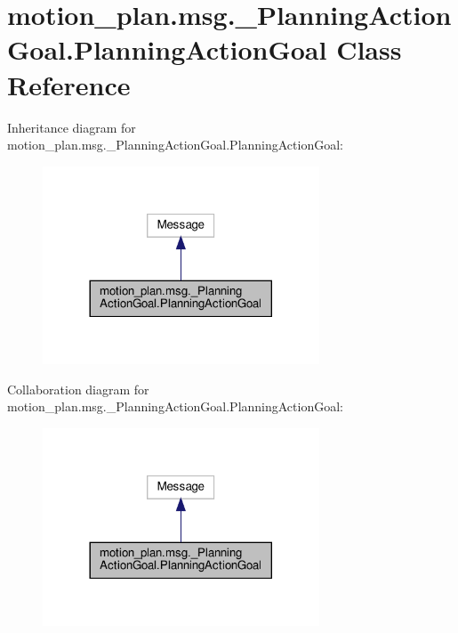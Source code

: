 \hypertarget{classmotion__plan_1_1msg_1_1__PlanningActionGoal_1_1PlanningActionGoal}{}\section{motion\+\_\+plan.\+msg.\+\_\+\+Planning\+Action\+Goal.\+Planning\+Action\+Goal Class Reference}
\label{classmotion__plan_1_1msg_1_1__PlanningActionGoal_1_1PlanningActionGoal}


Inheritance diagram for motion\+\_\+plan.\+msg.\+\_\+\+Planning\+Action\+Goal.\+Planning\+Action\+Goal\+:
\nopagebreak
\begin{figure}[H]
\begin{center}
\leavevmode
\includegraphics[width=233pt]{classmotion__plan_1_1msg_1_1__PlanningActionGoal_1_1PlanningActionGoal__inherit__graph}
\end{center}
\end{figure}


Collaboration diagram for motion\+\_\+plan.\+msg.\+\_\+\+Planning\+Action\+Goal.\+Planning\+Action\+Goal\+:
\nopagebreak
\begin{figure}[H]
\begin{center}
\leavevmode
\includegraphics[width=233pt]{classmotion__plan_1_1msg_1_1__PlanningActionGoal_1_1PlanningActionGoal__coll__graph}
\end{center}
\end{figure}
